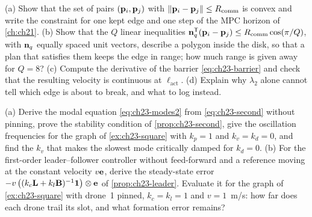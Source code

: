 \begin{exercise}[\difficulty{2}]
\label{exr:ch23-range}
(a) Show that the set of pairs $(\mathbf{p}_i, \mathbf{p}_j)$ with $\left\lVert \mathbf{p}_i - \mathbf{p}_j \right\rVert
\le R_{\mathrm{comm}}$ is convex and write the constraint for one kept edge and
one step of the MPC horizon of \cref{ch:ch21}. (b) Show that the $Q$ linear
inequalities $\mathbf{n}_q^{\mathsf{T}}(\mathbf{p}_i - \mathbf{p}_j) \le R_{\mathrm{comm}}\cos(\pi/Q)$,
with $\mathbf{n}_q$ equally spaced unit vectors, describe a polygon inside the
disk, so that a plan that satisfies them keeps the edge in range; how much
range is given away for $Q = 8$? (c) Compute the derivative of the barrier
\cref{eq:ch23-barrier} and check that the resulting velocity is continuous at
$\ell_{\mathrm{act}}$. (d) Explain why $\lambda_2$ alone cannot tell which
edge is about to break, and what to log instead.
\end{exercise}

\begin{exercise}[\difficulty{3}]
\label{exr:ch23-secondorder}
(a) Derive the modal equation \cref{eq:ch23-modes2} from
\cref{eq:ch23-second} without pinning, prove the stability condition of
\cref{prop:ch23-second}, give the oscillation frequencies for the graph of
\cref{ex:ch23-square} with $k_p = 1$ and $k_v = k_d = 0$, and find the $k_v$
that makes the slowest mode critically damped for $k_d = 0$. (b) For the
first-order leader--follower controller without feed-forward and a reference
moving at the constant velocity $v\mathbf{e}$, derive the steady-state error
$-v\,\bigl((k_c\mathbf{L} + k_l\mathbf{B})^{-1}\mathbf{1}\bigr)\otimes\mathbf{e}$ of
\cref{prop:ch23-leader}. Evaluate it for the graph of \cref{ex:ch23-square}
with drone~1 pinned, $k_c = k_l = 1$ and $v = 1$~m/s: how far does each drone
trail its slot, and what formation error remains?
\end{exercise}

